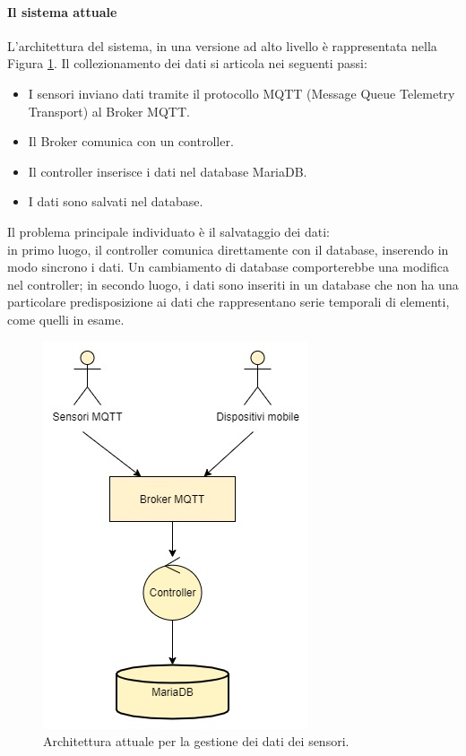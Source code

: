 \paragraph{Il sistema attuale}
L'architettura del sistema, in una versione ad alto livello è rappresentata nella Figura \ref{fig:datainsertionmaria}.
Il collezionamento dei dati si articola nei seguenti passi:
\begin{itemize}
    \item I sensori inviano dati tramite il protocollo MQTT (Message Queue Telemetry Transport) \cite{mqtt} al Broker MQTT.
    \item Il Broker comunica con un controller.
    \item Il controller inserisce i dati nel database MariaDB. 
    \item I dati sono salvati nel database.
\end{itemize}
Il problema principale individuato è il salvataggio dei dati:\\
in primo luogo, il controller comunica direttamente con il database, inserendo in modo sincrono i dati. Un cambiamento di database comporterebbe una modifica nel controller;
in secondo luogo, i dati sono inseriti in un database che non ha una particolare predisposizione ai dati che rappresentano serie temporali di elementi, come quelli in esame. 
\begin{figure}[h]
    \includegraphics[scale=0.67, center]{images/insertdatamaria.jpg}   
    \caption{Architettura attuale per la gestione dei dati dei sensori.}
    \label{fig:datainsertionmaria}
\end{figure} 

